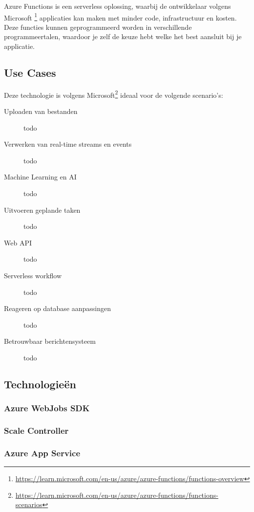 Azure Functions is een serverless oplossing, waarbij de ontwikkelaar volgens Microsoft \footnote{\label{af:what-is-it}\url{https://learn.microsoft.com/en-us/azure/azure-functions/functions-overview}} applicaties kan maken met minder code, infrastructuur en kosten. Deze functies kunnen geprogrammeerd worden in verschillende programmeertalen, waardoor je zelf de keuze hebt welke het best aansluit bij je applicatie. 

\subsection{Use Cases}

Deze technologie is volgens Microsoft\footnote{\label{af:scenarios}\url{https://learn.microsoft.com/en-us/azure/azure-functions/functions-scenarios}} ideaal voor de volgende scenario's:

\begin{description}
    \item[Uploaden van bestanden] todo
    \item[Verwerken van real-time streams en events] todo 
    \item[Machine Learning en AI] todo
    \item[Uitvoeren geplande taken] todo 
    \item[Web API] todo
    \item[Serverless workflow] todo
    \item[Reageren op database aanpassingen] todo
    \item[Betrouwbaar berichtensysteem] todo 
\end{description}

\subsection{Technologieën}

\subsubsection{Azure WebJobs SDK}

\subsubsection{Scale Controller}

\subsubsection{Azure App Service}


